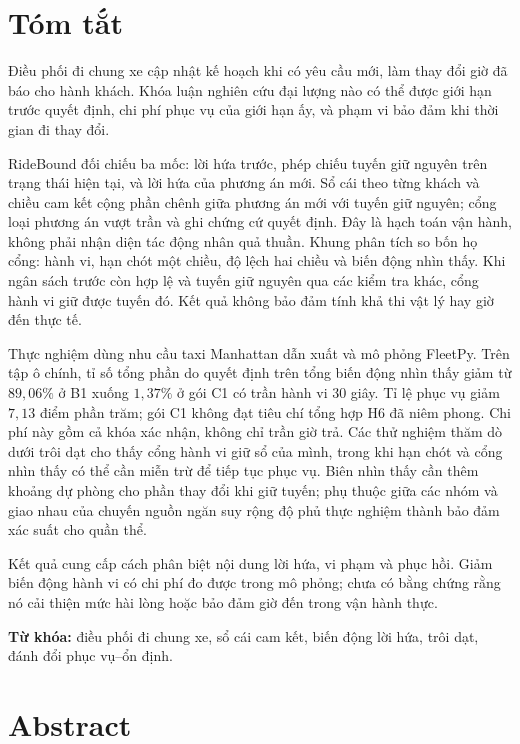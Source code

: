 ﻿\chapter*{Tóm tắt}

Điều phối đi chung xe cập nhật kế hoạch khi có yêu cầu mới, làm thay đổi giờ đã báo cho
hành khách. Khóa luận nghiên cứu đại lượng nào có thể được giới hạn trước quyết định,
chi phí phục vụ của giới hạn ấy, và phạm vi bảo đảm khi thời gian đi thay đổi.

RideBound đối chiếu ba mốc: lời hứa trước, phép chiếu tuyến giữ nguyên trên trạng thái
hiện tại, và lời hứa của phương án mới. Sổ cái theo từng khách và chiều cam kết cộng
phần chênh giữa phương án mới với tuyến giữ nguyên; cổng loại phương án vượt trần và
ghi chứng cứ quyết định. Đây là hạch toán vận hành, không phải nhận diện tác động nhân
quả thuần. Khung phân tích so bốn họ cổng: hành vi, hạn chót một chiều, độ lệch hai chiều
và biến động nhìn thấy. Khi ngân sách trước còn hợp lệ và tuyến giữ nguyên qua các kiểm
tra khác, cổng hành vi giữ được tuyến đó. Kết quả không bảo đảm tính khả thi vật lý hay
giờ đến thực tế.

Thực nghiệm dùng nhu cầu taxi Manhattan dẫn xuất và mô phỏng FleetPy. Trên tập ô chính,
tỉ số tổng phần do quyết định trên tổng biến động nhìn thấy giảm từ $89{,}06\%$ ở B1
xuống $1{,}37\%$ ở gói C1 có trần hành vi 30 giây. Tỉ lệ phục vụ giảm $7{,}13$ điểm
phần trăm; gói C1 không đạt tiêu chí tổng hợp H6 đã niêm phong. Chi phí này gồm cả khóa
xác nhận, không chỉ trần giờ trả. Các thử nghiệm thăm dò dưới trôi dạt cho thấy cổng
hành vi giữ sổ của mình, trong khi hạn chót và cổng nhìn thấy có thể cần miễn trừ để
tiếp tục phục vụ. Biên nhìn thấy cần thêm khoảng dự phòng cho phần thay đổi khi giữ
tuyến; phụ thuộc giữa các nhóm và giao nhau của chuyến nguồn ngăn suy rộng độ phủ
thực nghiệm thành bảo đảm xác suất cho quần thể.

Kết quả cung cấp cách phân biệt nội dung lời hứa, vi phạm và phục hồi. Giảm biến động
hành vi có chi phí đo được trong mô phỏng; chưa có bằng chứng rằng nó cải thiện mức
hài lòng hoặc bảo đảm giờ đến trong vận hành thực.

\vspace{6pt}
\noindent\textbf{Từ khóa:} điều phối đi chung xe, sổ cái cam kết, biến động lời hứa,
trôi dạt, đánh đổi phục vụ--ổn định.

\clearpage

\chapter*{Abstract}
\begingroup
{}


